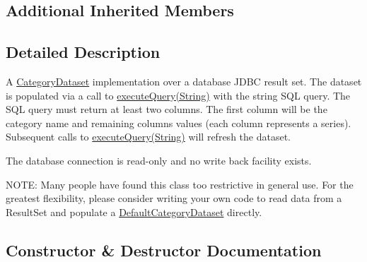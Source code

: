 \subsection*{Additional Inherited Members}


\subsection{Detailed Description}
A \mbox{\hyperlink{}{Category\+Dataset}} implementation over a database J\+D\+BC result set. The dataset is populated via a call to \mbox{\hyperlink{classorg_1_1jfree_1_1data_1_1jdbc_1_1_j_d_b_c_category_dataset_a9c414ca370a469776e84b4c27a587243}{execute\+Query(\+String)}} with the string S\+QL query. The S\+QL query must return at least two columns. The first column will be the category name and remaining columns values (each column represents a series). Subsequent calls to \mbox{\hyperlink{classorg_1_1jfree_1_1data_1_1jdbc_1_1_j_d_b_c_category_dataset_a9c414ca370a469776e84b4c27a587243}{execute\+Query(\+String)}} will refresh the dataset. 

The database connection is read-\/only and no write back facility exists. 

N\+O\+TE\+: Many people have found this class too restrictive in general use. For the greatest flexibility, please consider writing your own code to read data from a {\ttfamily Result\+Set} and populate a \mbox{\hyperlink{classorg_1_1jfree_1_1data_1_1category_1_1_default_category_dataset_a7aef01d862220fc6f4f384c31f2477fe}{Default\+Category\+Dataset}} directly. 

\subsection{Constructor \& Destructor Documentation}
\mbox{\label{classorg_1_1jfree_1_1data_1_1jdbc_1_1_j_d_b_c_category_dataset_a32154c8bf58ca7479d33f14131c34a3b}} 
